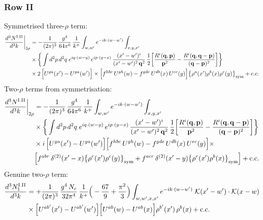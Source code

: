 \documentclass[9pt]{article}
\numberwithin{equation}{section}
\begin{document}
\subsubsection*{Row II}
Symmetrised three-$\rho$ term:
\begin{align}
\frac{d^{3}N^{\rm I.II}}{d^{3}k}\bigg|_{3\rho}&=-\frac{1}{(2\pi)^{3}}\,\frac{g^{4}}{64\pi^{6}}\,\frac{1}{k^{+}}\int_{w,w'}e^{-ik\cdot{(w-w')}}\int_{x,y,x'}\notag\\
&\times\bigg\{\int d^{2}p\,d^{2}q\;e^{iq\cdot(w-y)}\,e^{ip\cdot(y-x)}\,\frac{(x'-w')^{i}}{(x'-w')^{2}\,\mathbf{q}^{2}}\,\frac{1}{2}\bigg[\frac{R^{i}(\mathbf{q},\mathbf{p})}{\mathbf{p}^{2}}-\frac{R^{i}(\mathbf{q},\mathbf{q}-\mathbf{p})}{(\mathbf{q}-\mathbf{p})^{2}}\bigg]\bigg\}\notag\\
&\times 2\,\Big[U^{ga}(x')-U^{ga}(w')\Big]\times \Big[f^{hbc}\,U^{gh}(w)-f^{gde}\,U^{db}(x)\,U^{ec}(y)\Big]\big\{\rho^{a}(x')\rho^{b}(x)\rho^{c}(y)\big\}_{\rm sym}+{\rm c.c.}\label{eq:D-I.II-3}
\end{align}
Two-$\rho$ terms from symmetrisation:
\begin{align}
\frac{d^{3}N^{\rm I.II}}{d^{3}k}\bigg|_{2\rho}&=-\frac{1}{(2\pi)^{3}}\,\frac{g^{4}}{64\pi^{6}}\,\frac{1}{k^{+}}\int_{w,w'}e^{-ik\cdot{(w-w')}}\int_{x,y,x'}\notag\\
&\times\bigg\{\int d^{2}p\,d^{2}q\;e^{iq\cdot(w-y)}\,e^{ip\cdot(y-x)}\,\frac{(x'-w')^{i}}{(x'-w')^{2}\,\mathbf{q}^{2}}\,\frac{1}{2}\bigg[\frac{R^{i}(\mathbf{q},\mathbf{p})}{\mathbf{p}^{2}}-\frac{R^{i}(\mathbf{q},\mathbf{q}-\mathbf{p})}{(\mathbf{q}-\mathbf{p})^{2}}\bigg]\bigg\}\notag\\
&\times i\,\Big[U^{ga}(x')-U^{ga}(w')\Big]\Big[f^{hbc}\,U^{gh}(w)-f^{gde}\,U^{db}(x)\,U^{ec}(y)\Big]\times\notag \\ & \Big[f^{abr}\,\delta^{(2)}(x'-x)\big\{\rho^{r}(x')\rho^{c}(y)\big\}_{\rm sym}+f^{acr}\,\delta^{(2)}(x'-y)\big\{\rho^{r}(x')\rho^{b}(x)\big\}_{\rm sym}\Big]+{\rm c.c.}\label{eq:D-I.II-2}
\end{align}
Genuine two-$\rho$ term:
\begin{align}
\frac{d^{3}N^{\rm I.II}_{1}}{d^{3}k} & = +\frac{1}{(2\pi)^{3}}\,\frac{g^{4}\,N_{c}}{32\pi^{4}}\,\frac{1}{k^{+}}\Big(-\frac{67}{9}+\frac{\pi^{2}}{3}\Big)\int_{w,w',x,x'} e^{-ik\cdot{(w-w')}}\;\mathcal{K}(x'-w')\cdot\mathcal{K}(x-w)\notag \\
& \times\Big[U^{ab'}(x')-U^{ab'}(w')\Big]\Big[U^{ab}(w)-U^{ab}(x)\Big]\rho^{b'}(x')\,\rho^{b}(x) + {\rm c.c.}\label{eq:D-I.II-2o}
\end{align}
\end{document}
